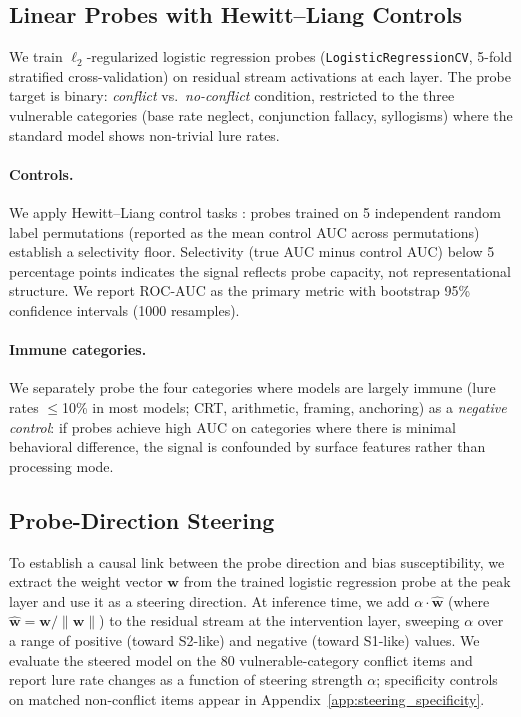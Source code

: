 \documentclass{article}
\newcommand{\sone}{S1-like}
\newcommand{\stwo}{S2-like}
\begin{document}
\subsection{Linear Probes with Hewitt--Liang Controls}
\label{sec:probes}

We train $\ell_2$-regularized logistic regression probes
(\texttt{LogisticRegressionCV}, 5-fold stratified cross-validation) on
residual stream activations at each layer.  The probe target is binary:
\emph{conflict} vs.\ \emph{no-conflict} condition, restricted to the three
vulnerable categories (base rate neglect, conjunction fallacy, syllogisms)
where the standard model shows non-trivial lure rates.

\paragraph{Controls.}  We apply Hewitt--Liang control tasks
\citep{hewitt2019control}: probes trained on 5 independent random label permutations (reported as the mean control AUC across permutations)
establish a selectivity floor.  Selectivity (true AUC minus control AUC)
below 5 percentage points indicates the signal reflects probe capacity,
not representational structure.  We report ROC-AUC as the primary metric
with bootstrap 95\% confidence intervals (1000 resamples).

\paragraph{Immune categories.}  We separately probe the four categories
where models are largely immune (lure rates $\leq$10\% in most models;
CRT, arithmetic, framing, anchoring) as a \emph{negative control}: if
probes achieve high AUC on categories where there is minimal behavioral
difference, the signal is confounded by surface features rather than
processing mode.

\subsection{Probe-Direction Steering}
\label{sec:methods_steering}

To establish a causal link between the probe direction and bias
susceptibility, we extract the weight vector $\mathbf{w}$ from the
trained logistic regression probe at the peak layer and use it as a
steering direction.  At inference time, we add $\alpha \cdot \hat{\mathbf{w}}$
(where $\hat{\mathbf{w}} = \mathbf{w} / \|\mathbf{w}\|$) to the
residual stream at the intervention layer, sweeping $\alpha$ over a
range of positive (toward \stwo{}) and negative (toward \sone{}) values.
We evaluate the steered model on the 80 vulnerable-category conflict
items and report lure rate changes as a function of steering strength
$\alpha$; specificity controls on matched non-conflict items appear in
Appendix~\ref{app:steering_specificity}.
\end{document}
